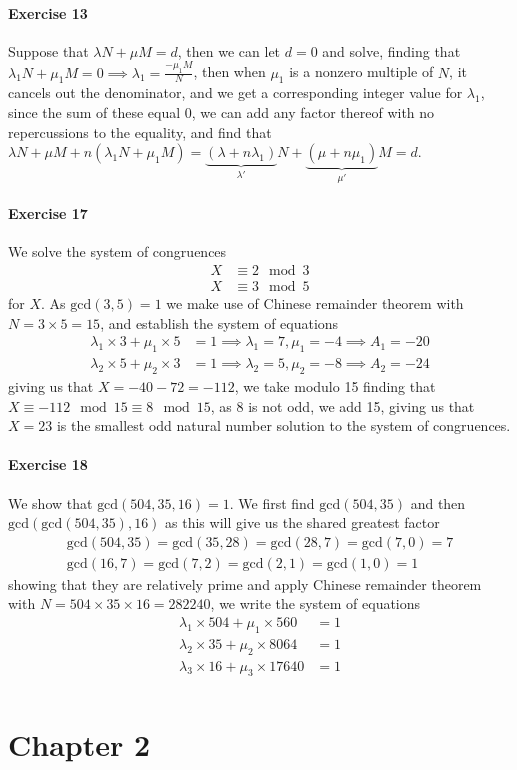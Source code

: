 \paragraph{Exercise 13}
Suppose that $\lambda N+\mu M=d$, then we can let $d=0$ and solve, finding that $\lambda_{1}N+\mu_{1}M=0\implies\lambda_{1}=\frac{-\mu_{1}M}{N}$, then when $\mu_{1}$ is a nonzero multiple of $N$, it cancels out the denominator, and we get a corresponding integer value for $\lambda_{1}$, since the sum of these equal 0, we can add any factor thereof with no repercussions to the equality, and find that $\lambda N+\mu M+n(\lambda_{1}N+\mu_{1}M)=\underbrace{(\lambda+n\lambda_{1})}_{\lambda'}N+\underbrace{(\mu+n\mu_{1})}_{\mu'}M=d$.
\paragraph{Exercise 17}
We solve the system of congruences
\begin{align*}
    X&\equiv 2\mod 3 \\
    X&\equiv 3\mod 5
\end{align*}
for $X$. As $\text{gcd}(3,5)=1$ we make use of Chinese remainder theorem with $N=3\times 5=15$, and establish the system of equations
\begin{align*}
    \lambda_{1}\times 3+\mu_{1}\times 5&=1\implies\lambda_{1}=7,\mu_{1}=-4\implies A_{1}=-20 \\
    \lambda_{2}\times 5+\mu_{2}\times3&=1\implies\lambda_{2}=5,\mu_{2}=-8\implies A_{2}=-24
\end{align*}
giving us that $X=-40-72=-112$, we take modulo 15 finding that $X\equiv-112\mod 15\equiv 8\mod 15$, as 8 is not odd, we add 15, giving us that $X=23$ is the smallest odd natural number solution to the system of congruences.
\paragraph{Exercise 18}
We show that $\text{gcd}(504,35,16)=1$. We first find $\text{gcd}(504,35)$ and then $\text{gcd}(\text{gcd}(504,35),16)$ as this will give us the shared greatest factor
\begin{align*}
  \text{gcd}(504,35)=\text{gcd}(35,28)=\text{gcd}(28,7)=\text{gcd}(7,0)=7 \\
  \text{gcd}(16,7)=\text{gcd}(7,2)=\text{gcd}(2,1)=\text{gcd}(1,0)=1
\end{align*}
showing that they are relatively prime and apply Chinese remainder theorem with $N=504\times 35\times 16=282240$, we write the system of equations
\begin{align*}
    \lambda_{1}\times 504+\mu_{1}\times 560&=1 \\
    \lambda_{2}\times 35+\mu_{2}\times 8064&=1 \\
    \lambda_{3}\times 16+\mu_{3}\times 17640&=1 \\
\end{align*}
\pagebreak\section{Chapter 2}
